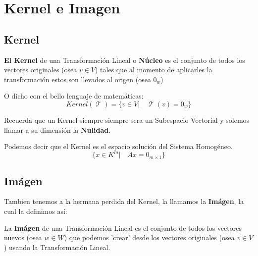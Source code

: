 \documentclass[12pt]{report}                                    %
\DeclareMathOperator \LinealTransformation {\mathcal{T}}        %
\begin{document}
\clearpage
\chapter{Kernel e Imagen}

    \clearpage
    \section{Kernel}
        \textbf{El Kernel} de una Transformación Lineal o \textbf{Núcleo} es el conjunto 
        de todos los vectores originales (osea $v \in V$) tales que al momento de
        aplicarles la transformación estos son llevados al origen (osea $0_w$)

        O dicho con el bello lenguaje de matemáticas:
        \begin{equation}
            Kernel(\LinealTransformation) = \{v \in V |\quad \LinealTransformation(v) = 0_w\}
        \end{equation}

        Recuerda que un Kernel siempre siempre sera un Subespacio Vectorial y solemos
        llamar a su dimensión la \textbf{Nulidad}.

        Podemos decir que el Kernel es el espacio solución del Sistema Homogéneo.
        \begin{equation*}
            \{x \in K^m |\quad Ax = 0_{m \times 1} \}
        \end{equation*}

    \section{Imágen}
        Tambien tenemos a la hermana perdida del Kernel, la llamamos la \textbf{Imágen},
        la cual la definimos así:

        La \textbf{Imágen} de una Transformación Lineal es el conjunto de todos los vectores
        nuevos (osea $w \in W$) que podemos 'crear' desde los vectores originales
        (osea $v \in V$) usando la Transformación Lineal.
\end{document}
